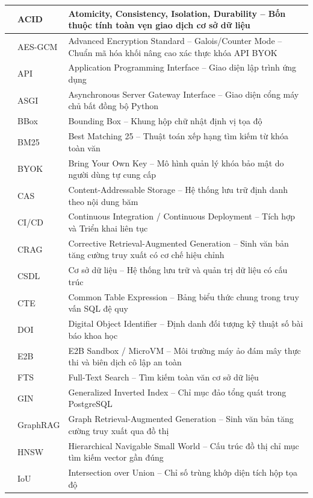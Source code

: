 \begin{xltabular}{\textwidth}{|>{\centering\arraybackslash}p{1.0cm}|>{\centering\arraybackslash}p{3.2cm}|X|}
1 & ACID & Atomicity, Consistency, Isolation, Durability -- Bốn thuộc tính toàn vẹn giao dịch cơ sở dữ liệu \\  & AES-GCM & Advanced Encryption Standard -- Galois/Counter Mode -- Chuẩn mã hóa khối nâng cao xác thực khóa API BYOK \\  & API & Application Programming Interface -- Giao diện lập trình ứng dụng \\  & ASGI & Asynchronous Server Gateway Interface -- Giao diện cổng máy chủ bất đồng bộ Python \\  & BBox & Bounding Box -- Khung hộp chữ nhật định vị tọa độ \\  & BM25 & Best Matching 25 -- Thuật toán xếp hạng tìm kiếm từ khóa toàn văn \\  & BYOK & Bring Your Own Key -- Mô hình quản lý khóa bảo mật do người dùng tự cung cấp \\  & CAS & Content-Addressable Storage -- Hệ thống lưu trữ định danh theo nội dung băm \\  & CI/CD & Continuous Integration / Continuous Deployment -- Tích hợp và Triển khai liên tục \\  & CRAG & Corrective Retrieval-Augmented Generation -- Sinh văn bản tăng cường truy xuất có cơ chế hiệu chỉnh \\  & CSDL & Cơ sở dữ liệu -- Hệ thống lưu trữ và quản trị dữ liệu có cấu trúc \\  & CTE & Common Table Expression -- Bảng biểu thức chung trong truy vấn SQL đệ quy \\  & DOI & Digital Object Identifier -- Định danh đối tượng kỹ thuật số bài báo khoa học \\  & E2B & E2B Sandbox / MicroVM -- Môi trường máy ảo đám mây thực thi và biên dịch cô lập an toàn \\  & FTS & Full-Text Search -- Tìm kiếm toàn văn cơ sở dữ liệu \\  & GIN & Generalized Inverted Index -- Chỉ mục đảo tổng quát trong PostgreSQL \\  & GraphRAG & Graph Retrieval-Augmented Generation -- Sinh văn bản tăng cường truy xuất qua đồ thị \\  & HNSW & Hierarchical Navigable Small World -- Cấu trúc đồ thị chỉ mục tìm kiếm vector gần đúng \\  & IoU & Intersection over Union -- Chỉ số trùng khớp diện tích hộp tọa độ \\ \hline

\end{xltabular}
